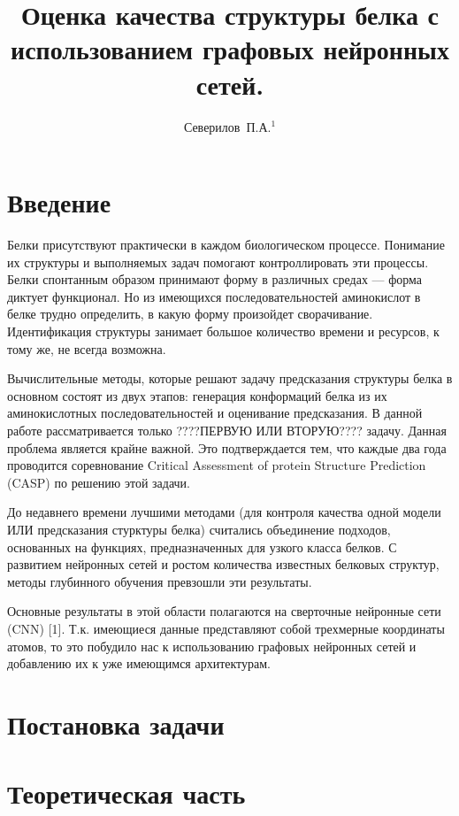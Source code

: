 \documentclass[12pt,twosides]{article}
\title
[Качество структуры белка с  графовыми сетями]
{Оценка качества структуры белка с использованием графовых нейронных сетей.}
\author
[Северилов~П.А.] 
{Северилов~П.А.$^1$}
\begin{document}
	\maketitle
	
	\section{Введение}
	
	Белки присутствуют практически в каждом биологическом процессе. Понимание их структуры и выполняемых задач помогают контроллировать эти процессы. Белки спонтанным образом принимают форму в различных средах — форма диктует функционал. Но из имеющихся последовательностей аминокислот в белке трудно определить, в какую форму произойдет сворачивание. Идентификация структуры занимает большое количество времени и ресурсов, к тому же, не всегда возможна. 
	
	Вычислительные методы, которые решают задачу предсказания структуры белка в основном состоят из двух этапов: генерация конформаций белка из их аминокислотных последовательностей и оценивание предсказания. В данной работе рассматривается только ????ПЕРВУЮ ИЛИ ВТОРУЮ???? задачу. Данная проблема является крайне важной. Это подтверждается тем, что каждые два года проводится соревнование Critical Assessment of protein Structure Prediction (CASP) по решению этой задачи.
	
	До недавнего времени лучшими методами (для контроля качества одной модели ИЛИ предсказания стурктуры белка) считались объединение подходов, основанных на функциях, предназначенных для узкого класса белков. С развитием нейронных сетей и ростом количества известных белковых структур, методы глубинного обучения превзошли эти результаты.
	
	Основные результаты в этой области полагаются на сверточные нейронные сети (CNN) [1]. Т.к. имеющиеся данные представляют собой трехмерные координаты атомов, то это побудило нас к использованию графовых нейронных сетей и добавлению их к уже имеющимся архитектурам.
	
	
	
	\section{Постановка задачи}
	
	\section{Теоретическая часть}
	
\end{document}
